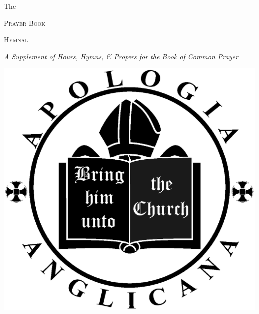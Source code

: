 \documentclass[10pt]{book}
\begin{document}
\begin{titlepage}
		\begin{center}
			{\Large{The}}
			\par
			\vspace{.4cm}
			{\Huge{\scshape Prayer Book}}
			\par
			\vspace{.4cm}
			{\Huge{\scshape Hymnal}}
			\par
			\vspace{.4cm}
			{\large{\textit{A Supplement of Hours, Hymns, \& Propers for the Book of Common Prayer}}}
			\par
			\vfill
   	        \includegraphics[scale=.17]{logo.eps}
		\end{center}
	\end{titlepage}
\cleardoublepage
{}
\tableofcontents
{}%
\clearpage


%
%
%
%
%
%
%
%
\end{document}
